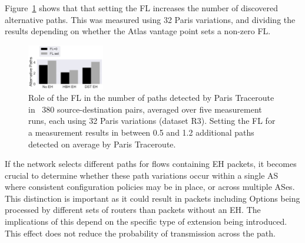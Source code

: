 \documentclass[conference]{IEEEtran}
\begin{document}
Figure~\ref{fig:paths-fl} shows that that setting the FL increases the number of discovered alternative paths.
This was measured using 32 Paris variations, and dividing the results depending on whether the Atlas vantage point sets a non-zero FL.

\begin{figure}[t]
\centering
  \includegraphics[width=0.3\textwidth]{FL.png}
  \caption{Role of the FL in the number of paths detected by Paris Traceroute in ~380
source-destination pairs, averaged over five measurement runs, each using 32 Paris variations (dataset R3). Setting the FL for a measurement results in between 0.5 and 1.2 additional paths detected on average by Paris Traceroute.}
  \label{fig:paths-fl}
\end{figure}




If the network selects different paths for flows containing EH packets, it
becomes crucial to determine whether these path variations occur within a
single AS where consistent configuration policies may be in
place, or across multiple ASes. This distinction is important as it could
result in packets including Options being processed by different sets of routers than packets
without an EH. The implications of this depend on the specific type of
extension being introduced. This effect
does not reduce the probability of transmission across the path.
\end{document}
